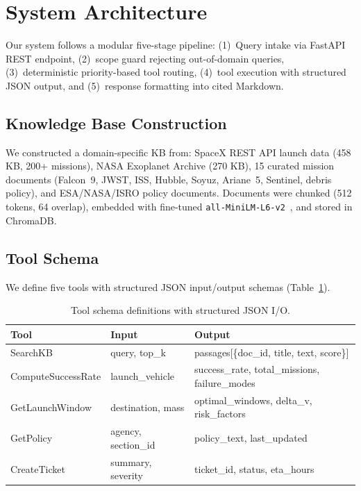 \documentclass{article}
\begin{document}
\section{System Architecture}

Our system follows a modular five-stage pipeline:
(1)~Query intake via FastAPI REST endpoint,
(2)~scope guard rejecting out-of-domain queries,
(3)~deterministic priority-based tool routing,
(4)~tool execution with structured JSON output, and
(5)~response formatting into cited Markdown.

\subsection{Knowledge Base Construction}

We constructed a domain-specific KB from:
SpaceX REST API launch data (458 KB, 200+ missions),
NASA Exoplanet Archive (270 KB),
15 curated mission documents (Falcon~9, JWST, ISS, Hubble, Soyuz, Ariane~5, Sentinel, debris policy), and
ESA/NASA/ISRO policy documents.
Documents were chunked (512 tokens, 64 overlap), embedded with fine-tuned \texttt{all-MiniLM-L6-v2}~\citep{reimers2019sentencebert}, and stored in ChromaDB.

\subsection{Tool Schema}

We define five tools with structured JSON input/output schemas (Table~\ref{tab:tools}).

\begin{table}[h]
\centering
\small
\begin{tabular}{@{}l l p{4.5cm}@{}}
\toprule
\textbf{Tool} & \textbf{Input} & \textbf{Output} \\
\midrule
SearchKB & query, top\_k & passages[\{doc\_id, title, text, score\}] \\
ComputeSuccessRate & launch\_vehicle & success\_rate, total\_missions, failure\_modes \\
GetLaunchWindow & destination, mass & optimal\_windows, delta\_v, risk\_factors \\
GetPolicy & agency, section\_id & policy\_text, last\_updated \\
CreateTicket & summary, severity & ticket\_id, status, eta\_hours \\
\bottomrule
\end{tabular}
\caption{Tool schema definitions with structured JSON I/O.}
\label{tab:tools}
\end{table}
\end{document}
